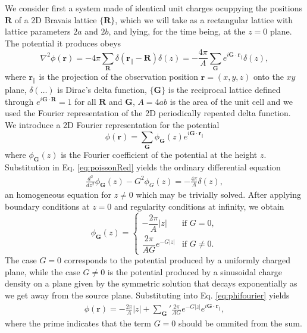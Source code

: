 \documentclass{article}
\newcommand{\abs}[1]{\lvert#1\rvert}
\begin{document}
We consider first a system made of identical unit charges
ocuppying the positions $\bm R$ of a 2D Bravais lattice $\{\bm R\}$,
which we will take as a rectangular lattice with lattice parameters
$2a$ and $2b$, and lying, for the time being, at the $z=0$ plane.
The potential it produces obeys
\begin{equation}
  \label{eq:poissonRed}
  \nabla^2\phi(\bm r)=-4\pi\sum_{\bm R}\delta(\bm r_\|-\bm
  R)\delta(z)=-\frac{4\pi}{A}\sum_{\bm G}e^{i\bm G\cdot\bm r_\|}\delta(z),
\end{equation}
where $\bm r_\|$ is the projection of the observation position $\bm
r=(x,y,z)$ onto the $xy$ plane,
$\delta(\ldots)$ is Dirac's delta function, $\{\bm G\}$ is the
reciprocal lattice defined through $e^{i\bm G\cdot\bm R}=1$ for all
$\bm R$ and $\bm G$, $A=4ab$ is the area of the unit cell
and we used the Fourier representation of the 2D
periodically repeated delta function. We introduce a 2D Fourier representation for
the potential
\begin{equation}
  \label{eq:phifourier}
  \phi(\bm r)=\sum_{\bm G}\phi_{\bm G}(z)e^{i\bm G\cdot\bm r_\|}
\end{equation}
where $\phi_{\bm G}(z)$ is the Fourier coefficient of the potential at
the height $z$. Substitution in Eq. \eqref{eq:poissonRed} yields the
ordinary differential equation
 \begin{eqnarray}
 \frac{d^2}{dz^2}\phi_{\bm G}(z)-G^2\phi_G(z)=
   -\frac{4 \pi}{A} \delta(z),
 \end{eqnarray}
an homogeneous equation for $z\ne0$ which may be trivially
solved. After applying boundary conditions at $z=0$ and regularity
conditions at infinity, we obtain
\begin{equation}
  \label{eq:phiG}
  \phi_{\bm G}(z)=
  \begin{cases}
    -\dfrac{2\pi}{A}\abs{z}&\text{if }G=0,\\
    \dfrac{2 \pi}{AG}  e^{- G \abs{z}}&\text{if }G\neq 0.
  \end{cases}
\end{equation}
The case $G=0$ corresponds to the potential produced by a uniformly charged plane,
while the case $G\ne 0$ is the potential produced by a sinusoidal
charge density on a plane given by the
symmetric solution that decays exponentially as we get away from
the source plane. Substituting into Eq. \eqref{eq:phifourier} yields
\begin{eqnarray}
  \label{eq:phiG1}
 \phi(\bm r) = -\frac{2 \pi}{A}  \abs{z} +{\sum_{\bm G}}' \frac{2 \pi
   }{AG} e^{- G \abs{z}} e^{i \bm G\cdot\bm r_\|},
 \end{eqnarray}
where the prime indicates that the term $G=0$ should be ommited from
the sum.
\end{document}
